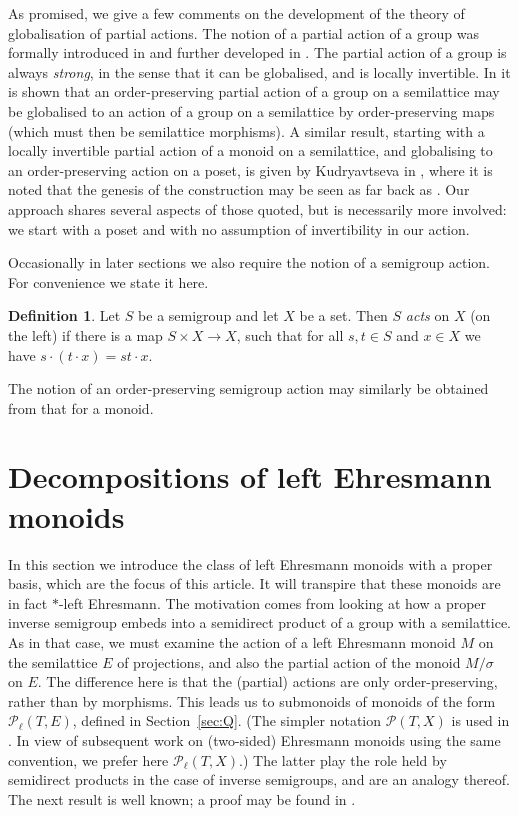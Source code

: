 \documentclass[12pt]{amsart}
\theoremstyle{definition}
\newtheorem{defn}[them]{Definition}
\theoremstyle{definition}
\numberwithin{them}{section}
\numberwithin{equation}{section}
\begin{document}
 As promised, we give a  few comments on the development of the theory of globalisation of partial actions.  The notion of a partial action of a group was formally introduced in \cite{exel:1998} and further developed in \cite{kellendonk:2004}. The partial action of a group is always {\em strong}, in the sense that it can be globalised, and is locally invertible. In \cite{kellendonk:2004} it is shown that an order-preserving partial action of a group on a semilattice may be globalised to an action of a group on a semilattice by order-preserving maps (which must then be semilattice morphisms). A similar result, starting with a locally invertible partial action of a monoid on a semilattice, and globalising to an order-preserving action on a poset, is given by Kudryavtseva in \cite{kudryavtseva:2015}, where it is noted that the genesis of the construction may be seen as far back as \cite{munn:1976}. Our approach shares several aspects of those quoted, but is necessarily  more involved: we start with a poset and with no assumption of invertibility in our action. 


Occasionally in later sections we also require the notion of a semigroup action. For convenience we state it here.

\begin{defn}\label{defn:saction} Let $S$ be a semigroup and let $X$ be a set. Then $S$ {\em acts} on $X$ (on the left) if there is a map $S\times X\rightarrow X $, such that for all $s, t \in S$ and $x \in X$ we have
$s\cdot (t\cdot x)=st\cdot x$.\end{defn}

The notion of an order-preserving semigroup action may similarly be obtained from that for a monoid. 


\section{ Decompositions of  left Ehresmann monoids} \label{sec:H-proper}



In this section we introduce the class of left Ehresmann monoids with a proper basis,  which are the focus of this article. It will transpire that these monoids are in fact $*$-left Ehresmann.  The motivation comes from looking at how a proper inverse semigroup embeds into a semidirect product of a group with a semilattice. As in that case,  we must examine the action of a left  Ehresmann monoid  $M$ on the semilattice $E$ of projections, and also the partial action of the monoid
$M/\sigma$ on $E$. The difference here is that the (partial) actions are only order-preserving, rather than by morphisms. This leads us to  submonoids of  monoids of the form $\mathcal{P}_{\ell}(T,E)$,  defined in Section~\ref{sec:Q}. (The simpler notation $\mathcal{P}(T,X)$ is used in \cite{GG}. In view of subsequent work on (two-sided) Ehresmann monoids using the same convention, we prefer here  $\mathcal{P}_{\ell}(T,X)$.) The latter play the role held by semidirect products in the case of inverse semigroups, and are an  analogy thereof. The next result is well known;  a proof may be found in \cite{BGG}.  
\end{document}
